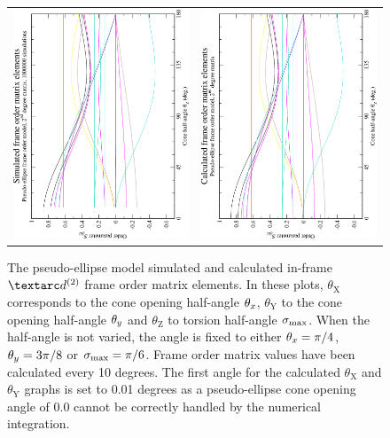 \begin{figure}
\begin{tabular}{@{}cc@{}}
    \\[-5pt]
    \includegraphics[width=.35\textwidth,angle=270]{images/frame_order_matrix/Sijkl_pseudo-ellipse_in_frame_theta_z_ens1000000.eps} &
    \includegraphics[width=.35\textwidth,angle=270]{images/frame_order_matrix/Sijkl_pseudo-ellipse_in_frame_theta_z_calc.eps} \\
  \end{tabular}
  \caption[Pseudo-ellipse simulated and calculated in-frame Daeg$^{(2)}$ elements.]{
    The pseudo-ellipse model simulated and calculated in-frame $\FOtwo$ frame order matrix elements.
    In these plots, $\theta_\textrm{X}$ corresponds to the cone opening half-angle $\theta_x$, $\theta_\textrm{Y}$ to the cone opening half-angle $\theta_y$ and $\theta_\textrm{Z}$ to torsion half-angle $\sigma_\textrm{max}$.
    When the half-angle is not varied, the angle is fixed to either $\theta_x = \pi/4$, $\theta_y = 3\pi/8$ or $\sigma_\textrm{max} = \pi/6$.
    Frame order matrix values have been calculated every 10 degrees.
    The first angle for the calculated $\theta_\textrm{X}$ and $\theta_\textrm{Y}$ graphs is set to 0.01 degrees as a pseudo-ellipse cone opening angle of 0.0 cannot be correctly handled by the numerical integration.
  }
  \label{fig: simulated and calculated in-frame 2nd degree pseudo-ellipse frame order}
\end{figure}


